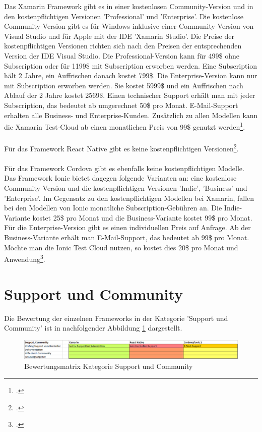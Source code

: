 Das Xamarin Framework gibt es in einer kostenlosen Community-Version und in den kostenpflichtigen Versionen 'Professional' und 'Enterprise'. Die kostenlose Community-Version gibt es für Windows inklusive einer Community-Version von Visual Studio und für Apple mit der IDE 'Xamarin Studio'. Die Preise der kostenpflichtigen Versionen richten sich nach den Preisen der entsprechenden Version der IDE Visual Studio. Die Professional-Version kann für 499\$ ohne Subscription oder für 1199\$ mit Subscription erworben werden. Eine Subscription hält 2 Jahre, ein Auffrischen danach kostet 799\$. Die Enterprise-Version kann nur mit Subscription erworben werden. Sie kostet 5999\$ und ein Auffrischen nach Ablauf der 2 Jahre kostet 2569\$. Einen technischer Support  erhält man mit jeder Subscription, das bedeutet ab umgerechnet 50\$ pro Monat. E-Mail-Support erhalten alle Business- und Enterprise-Kunden. Zusätzlich zu allen Modellen kann die Xamarin Test-Cloud ab einen monatlichen Preis von 99\$ genutzt werden\footcite{XamarinPricing}.
\\
\\
Für das Framework React Native gibt es keine kostenpflichtigen Versionen\footcite{ReactNativeHomepage}. 
\\
\\
Für das Framework Cordova gibt es ebenfalls keine kostenpflichtigen Modelle. Das Framework Ionic bietet dagegen folgende Varianten an: eine kostenlose Community-Version und die kostenpflichtigen Versionen 'Indie', 'Business' und 'Enterprise'. Im Gegensatz zu den kostenpflichtigen Modellen bei Xamarin, fallen bei den Modellen von Ionic monatliche Subscription-Gebühren an. Die Indie-Variante kostet 25\$ pro Monat und die Business-Variante kostet 99\$ pro Monat. Für die Enterprise-Version gibt es einen individuellen Preis auf Anfrage. Ab der Business-Variante erhält man E-Mail-Support, das bedeutet ab 99\$ pro Monat. Möchte man die Ionic Test Cloud nutzen, so kostet dies 20\$ pro Monat und Anwendung\footcite{IonicHomepage}.  

\section{Support und Community} \label{AuswsuppComm}

Die Bewertung der einzelnen Frameworks in der Kategorie 'Support und Community' ist in nachfolgender Abbildung \ref{fig:AuswSuppComm} dargestellt.

\begin{figure}[h]
	\centering
	\includegraphics[width=1\textwidth]{Bilder/Auswertung_SupportCommunity.PNG}
	\caption{Bewertungsmatrix Kategorie Support und Community}
	\label{fig:AuswSuppComm}
\end{figure}

